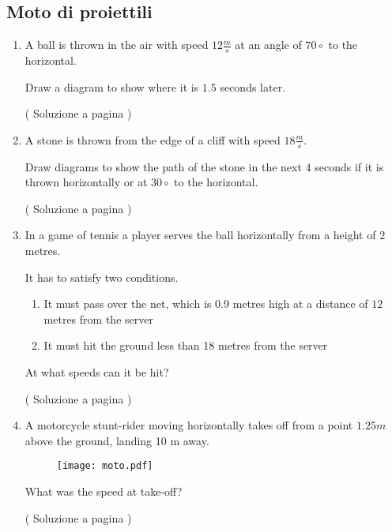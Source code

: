 \subsection{Moto di proiettili}

\begin{enumerate}

\item A ball is thrown in the air with speed $12\frac{m}{s}$ at an angle of $70\circ$ to the horizontal.  \label{ex_p_1}

Draw a diagram to show where it is $1.5$ seconds later.

( Soluzione a pagina \pageref{sol_p_1} )

\item A stone is thrown from the edge of a cliff with speed $18 \frac{m}{s}$.

Draw diagrams to show the path of the stone in the next $4$ seconds if it is thrown horizontally or at $30\circ$ to the horizontal. \label{ex_p_2}

( Soluzione a pagina \pageref{sol_p_2} )

\item In a game of tennis a player serves the ball horizontally from a height of $2$ metres.\label{ex_p_3}

It has to satisfy two conditions.
\begin{enumerate}
\item It must pass over the net, which is 0.9 metres high at a distance of $12$ metres from the server
\item It must hit the ground less than 18 metres from the server
\end{enumerate}

At what speeds can it be hit?

( Soluzione a pagina \pageref{sol_p_3} )

\item A motorcycle stunt-rider moving horizontally takes off from a point $1.25 m$ above the ground, landing 10 m away. \label{ex_p_4}

\begin{figure}[H]
\centering
\texttt{[image: moto.pdf]}
\end{figure}

What was the speed at take-off?

( Soluzione a pagina \pageref{sol_p_4} )

\end{enumerate}


